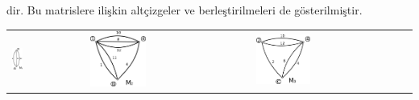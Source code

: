 \documentclass[11pt]{amsbook}
\begin{document}
\noindent dir. Bu matrislere ilişkin altçizgeler ve berleştirilmeleri  de gösterilmiştir.\\
\begin{tabular}{ l l l }
 \includegraphics[width=0.16\textwidth]{images/ceyhun-167-fig01}&\includegraphics[width=0.36\textwidth]{images/ceyhun-167-fig02} &\includegraphics[width=0.36\textwidth]{images/ceyhun-167-fig03} \\
\end{tabular}
\\
\end{document}
